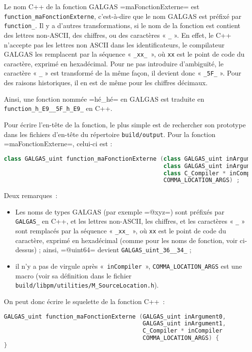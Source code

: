 Le nom C++ de la fonction GALGAS \ggs=maFonctionExterne= est \texttt{function\_maFonctionExterne}, c'est-à-dire que le nom GALGAS est préfixé par \texttt{function\_}. Il y a d'autres transformations, si le nom de la fonction est contient des lettres non-ASCII, des chiffres, ou des caractères « \texttt{\_} ». En effet, le C++ n'accepte pas les lettres non ASCII dans les identificateurs, le compilateur GALGAS les remplacent par la séquence « \texttt{\_xx\_ }», où \texttt{xx} est le point de code du caractère, exprimé en hexadécimal. Pour ne pas introduire d'ambiguïté, le caractère « \texttt{\_} » est transformé de la même façon, il devient donc « \texttt{\_5F\_} ». Pour des raisons historiques, il en est de même pour les chiffres décimaux.

Ainsi, une fonction nommée \ggs=hé_hé= en GALGAS est traduite en \texttt{function\_h\_E9\_\_5F\_h\_E9\_} en C++.

Pour écrire l'en-tête de la fonction, le plus simple est de rechercher son prototype dans les fichiers d'en-tête du répertoire \texttt{build/output}. Pour la fonction \ggs=maFonctionExterne=, celui-ci est :

\begin{lstlisting}[language=C++]
class GALGAS_uint function_maFonctionExterne (class GALGAS_uint inArgument0,
                                              class GALGAS_uint inArgument1,
                                              class C_Compiler * inCompiler
                                              COMMA_LOCATION_ARGS) ;
\end{lstlisting}


Deux remarques~:
\begin{itemize}
  \item Les noms de types GALGAS (par exemple \ggs=@xyz=) sont préfixés par \texttt{GALGAS\_} en C++, et les lettres non-ASCII, les chiffres, et les caractères « \texttt{\_} »  sont remplacés par la séquence « \texttt{\_xx\_ }», où \texttt{xx} est le point de code du caractère, exprimé en hexadécimal (comme pour les noms de fonction, voir ci-dessus) ; ainsi, \ggs=@uint64= devient \texttt{GALGAS\_uint\_36\_\_34\_} ;
  \item il n'y a pas de virgule après «~\texttt{inCompiler}~», \texttt{COMMA\_LOCATION\_ARGS} est une macro (voir sa définition dans le fichier \texttt{build/libpm/utilities/M\_SourceLocation.h}).
\end{itemize}


On peut donc écrire le squelette de la fonction C++~:
\begin{lstlisting}[language=C++]
GALGAS_uint function_maFonctionExterne (GALGAS_uint inArgument0,
                                        GALGAS_uint inArgument1,
                                        C_Compiler * inCompiler
                                        COMMA_LOCATION_ARGS) {
}
\end{lstlisting}

